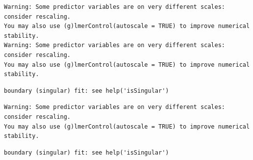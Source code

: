 \documentclass[
  landscape]{article}
\newenvironment{Shaded}{\begin{snugshade}}{\end{snugshade}}
\newcommand{\AttributeTok}[1]{\textcolor[rgb]{0.13,0.29,0.53}{#1}}
\newcommand{\FunctionTok}[1]{\textcolor[rgb]{0.13,0.29,0.53}{\textbf{#1}}}
\newcommand{\NormalTok}[1]{#1}
\newcommand{\OtherTok}[1]{\textcolor[rgb]{0.56,0.35,0.01}{#1}}
\newcommand{\SpecialCharTok}[1]{\textcolor[rgb]{0.81,0.36,0.00}{\textbf{#1}}}
\newcommand{\StringTok}[1]{\textcolor[rgb]{0.31,0.60,0.02}{#1}}
\begin{document}
\begin{verbatim}
Warning: Some predictor variables are on very different scales: consider rescaling. 
You may also use (g)lmerControl(autoscale = TRUE) to improve numerical stability.
Warning: Some predictor variables are on very different scales: consider rescaling. 
You may also use (g)lmerControl(autoscale = TRUE) to improve numerical stability.
\end{verbatim}

\begin{verbatim}
boundary (singular) fit: see help('isSingular')
\end{verbatim}

\begin{verbatim}
Warning: Some predictor variables are on very different scales: consider rescaling. 
You may also use (g)lmerControl(autoscale = TRUE) to improve numerical stability.
\end{verbatim}

\begin{verbatim}
boundary (singular) fit: see help('isSingular')
\end{verbatim}

\begin{Shaded}
\end{Shaded}
\end{document}
